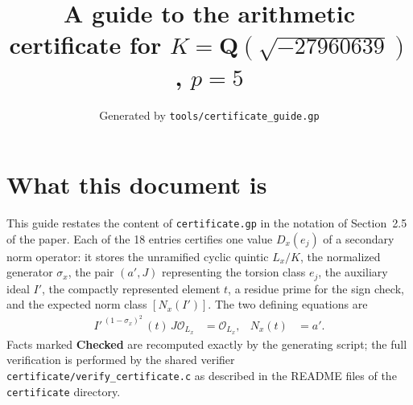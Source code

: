 \documentclass[11pt]{article}
\title{A guide to the arithmetic certificate for $K=\mathbf Q(\sqrt{-27960639})$, $p=5$}
\author{}
\date{Generated by \texttt{tools/certificate\_guide.gp}}
\begin{document}
\maketitle
\section*{What this document is}
This guide restates the content of \texttt{certificate.gp} in the
notation of Section~2.5 of the paper.  Each of the 18 entries
certifies one value $D_x(e_j)$ of a secondary norm operator: it
stores the unramified cyclic quintic $L_x/K$, the normalized
generator $\sigma_x$, the pair $(a',J)$ representing the torsion
class $e_j$, the auxiliary ideal $I'$, the compactly represented
element $t$, a residue prime for the sign check, and the expected
norm class $[N_x(I')]$.  The two defining equations are
\begin{align*}
I'^{\,(1-\sigma_x)^2}\,(t)\,J\mathcal O_{L_x}&=\mathcal O_{L_x},&
N_x(t)&=a'.
\end{align*}
Facts marked \textbf{Checked} are recomputed exactly by the
generating script; the full verification is performed by the
shared verifier \texttt{certificate/verify\_certificate.c} as
described in the README files of the \texttt{certificate}
directory.
\end{document}
